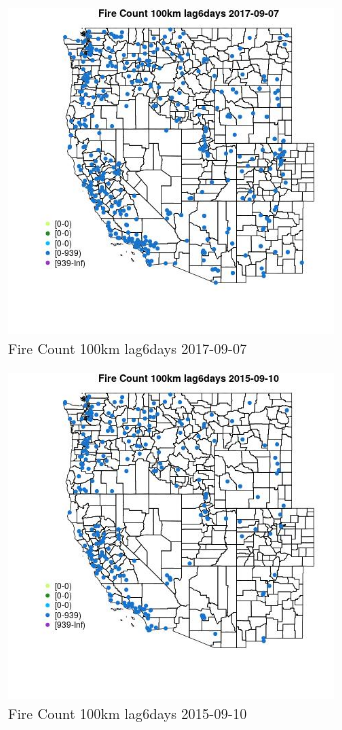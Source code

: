 \begin{figure} 
\centering  
\includegraphics[width=0.77\textwidth]{Code_Outputs/Report_ML_input_PM25_Step4_part_e_de_duplicated_aves_compiled_2019-05-20wNAs_MapObsFire_Count_100km_lag6days2017-09-07.jpg} 
\caption{\label{fig:Report_ML_input_PM25_Step4_part_e_de_duplicated_aves_compiled_2019-05-20wNAsMapObsFire_Count_100km_lag6days2017-09-07}Fire Count 100km lag6days 2017-09-07} 
\end{figure} 
 

\begin{figure} 
\centering  
\includegraphics[width=0.77\textwidth]{Code_Outputs/Report_ML_input_PM25_Step4_part_e_de_duplicated_aves_compiled_2019-05-20wNAs_MapObsFire_Count_100km_lag6days2015-09-10.jpg} 
\caption{\label{fig:Report_ML_input_PM25_Step4_part_e_de_duplicated_aves_compiled_2019-05-20wNAsMapObsFire_Count_100km_lag6days2015-09-10}Fire Count 100km lag6days 2015-09-10} 
\end{figure} 
 

